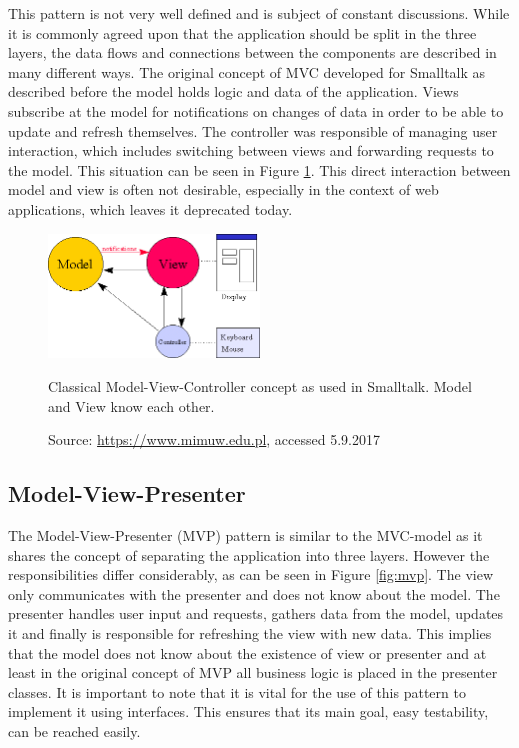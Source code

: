 This pattern is not very well defined and is subject of constant discussions. While it is commonly agreed upon that the application should be split in the three layers, the data flows and connections between the components are described in many different ways. The original concept of MVC developed for Smalltalk as described before the model holds logic and data of the application. Views subscribe at the model for notifications on changes of data in order to be able to update and refresh themselves. The controller was responsible of managing user interaction, which includes switching between views and forwarding requests to the model. This situation can be seen in Figure \ref{fig:mvc-smalltalk}. This direct interaction between model and view is often not desirable, especially in the context of web applications, which leaves it deprecated today. 

\begin{figure}[htbp]
	\centering
	\label{fig:mvc-smalltalk}
	
	\includegraphics[width=0.5\textwidth]{./content/pictures/mvc-smalltalk.jpg}
	\caption{Classical Model-View-Controller concept as used in Smalltalk. Model and View know each other.}
	\caption*{Source: \href{https://www.mimuw.edu.pl/\~sl/teaching/00\_01/Delfin\_EC/Overviews/MVC.htm}{https://www.mimuw.edu.pl}, accessed 5.9.2017}
\end{figure}

\subsection{Model-View-Presenter}
The Model-View-Presenter (MVP) pattern is similar to the MVC-model as it shares the concept of separating the application into three layers. However the responsibilities differ considerably, as can be seen in Figure \ref{fig:mvp}. The view only communicates with the presenter and does not know about the model. The presenter handles user input and requests, gathers data from the model, updates it and finally is responsible for refreshing the view with new data. This implies that the model does not know about the existence of view or presenter and at least in the original concept of MVP all business logic is placed in the presenter classes. It is important to note that it is vital for the use of this pattern to implement it using interfaces. This ensures that its main goal, easy testability, can be reached easily. 

